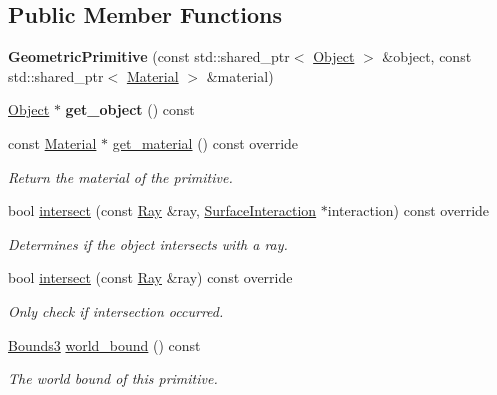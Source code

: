 \subsection*{Public Member Functions}
\begin{DoxyCompactItemize}
\item 
\mbox{\label{classomg_1_1_geometric_primitive_a1f6a07e3111c7b868b57913f44fe1a91}} 
{\bfseries Geometric\+Primitive} (const std\+::shared\+\_\+ptr$<$ \mbox{\hyperlink{classomg_1_1_object}{Object}} $>$ \&object, const std\+::shared\+\_\+ptr$<$ \mbox{\hyperlink{classomg_1_1_material}{Material}} $>$ \&material)
\item 
\mbox{\label{classomg_1_1_geometric_primitive_ab2fb03a946e7512066108df311cf2b63}} 
\mbox{\hyperlink{classomg_1_1_object}{Object}} $\ast$ {\bfseries get\+\_\+object} () const
\item 
const \mbox{\hyperlink{classomg_1_1_material}{Material}} $\ast$ \mbox{\hyperlink{classomg_1_1_geometric_primitive_ae7b7b9ed0a5fc336a3111ef16a09f27a}{get\+\_\+material}} () const override
\begin{DoxyCompactList}\small\item\em Return the material of the primitive. \end{DoxyCompactList}\item 
bool \mbox{\hyperlink{classomg_1_1_geometric_primitive_a21bc48f971cbc94b60791906f20bc925}{intersect}} (const \mbox{\hyperlink{classomg_1_1_ray}{Ray}} \&ray, \mbox{\hyperlink{classomg_1_1_surface_interaction}{Surface\+Interaction}} $\ast$interaction) const override
\begin{DoxyCompactList}\small\item\em Determines if the object intersects with a ray. \end{DoxyCompactList}\item 
bool \mbox{\hyperlink{classomg_1_1_geometric_primitive_a797a2eb74fb48a7e25c7f98f16c604a7}{intersect}} (const \mbox{\hyperlink{classomg_1_1_ray}{Ray}} \&ray) const override
\begin{DoxyCompactList}\small\item\em Only check if intersection occurred. \end{DoxyCompactList}\item 
\mbox{\hyperlink{classomg_1_1_bounds3}{Bounds3}} \mbox{\hyperlink{classomg_1_1_geometric_primitive_ae8f0945c180c43e32cad4faa75185522}{world\+\_\+bound}} () const
\begin{DoxyCompactList}\small\item\em The world bound of this primitive. \end{DoxyCompactList}\end{DoxyCompactItemize}


